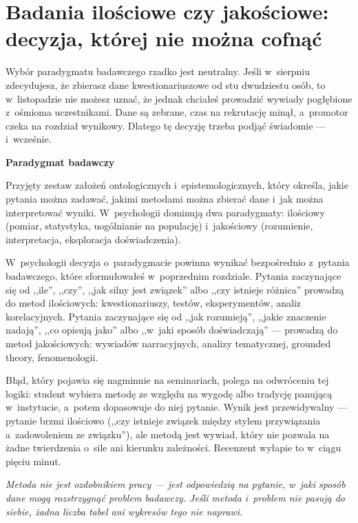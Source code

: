 \documentclass[12pt,a4paper,twoside,openany]{book}
\let\bforigsection\section
\renewcommand{\section}{\needspace{4\baselineskip}\bforigsection}
\newcommand{\pullquote}[1]{%
  \par\vspace{12pt}\noindent
  \begin{tcolorbox}[blanker, breakable, left=2.2em, right=1em, top=2pt, bottom=2pt,
    borderline west={2.5pt}{0pt}{accent}]
    {\color{chaptercolor}\Large\itshape #1}
  \end{tcolorbox}\vspace{10pt}\par
}
\newcommand{\concept}[2]{%
  \par\vspace{6pt}
  \begin{tcolorbox}[enhanced, breakable, colback=accent!6, colframe=accent,
    boxrule=0pt, leftrule=3.5pt, arc=2pt, drop fuzzy shadow={black!15},
    left=10pt, right=10pt, top=7pt, bottom=7pt, before upper={\parindent0pt}]
    {\sffamily\bfseries\color{accent}#1}\par\vspace{2pt}\small #2
  \end{tcolorbox}\par
}
\begin{document}
\section{Badania ilościowe czy jakościowe: decyzja, której nie można cofnąć}

Wybór paradygmatu badawczego rzadko jest neutralny. Jeśli w~sierpniu zdecydujesz, że zbierasz dane kwestionariuszowe od stu dwudziestu osób, to w~listopadzie nie możesz uznać, że jednak chciałeś prowadzić wywiady pogłębione z~ośmioma uczestnikami. Dane są zebrane, czas na rekrutację minął, a~promotor czeka na rozdział wynikowy. Dlatego tę decyzję trzeba podjąć świadomie --- i~wcześnie.

\concept{Paradygmat badawczy}{Przyjęty zestaw założeń ontologicznych i~epistemologicznych, który określa, jakie pytania można zadawać, jakimi metodami można zbierać dane i~jak można interpretować wyniki. W~psychologii dominują dwa paradygmaty: ilościowy (pomiar, statystyka, uogólnianie na populację) i~jakościowy (rozumienie, interpretacja, eksploracja doświadczenia).}

W~psychologii decyzja o~paradygmacie powinna wynikać bezpośrednio z~pytania badawczego, które sformułowałeś w~poprzednim rozdziale. Pytania zaczynające się od ,,ile'', ,,czy'', ,,jak silny jest związek'' albo ,,czy istnieje różnica'' prowadzą do metod ilościowych: kwestionariuszy, testów, eksperymentów, analiz korelacyjnych. Pytania zaczynające się od ,,jak rozumieją'', ,,jakie znaczenie nadają'', ,,co opisują jako'' albo ,,w~jaki sposób doświadczają'' --- prowadzą do metod jakościowych: wywiadów narracyjnych, analizy tematycznej, grounded theory, fenomenologii.

Błąd, który pojawia się nagminnie na seminariach, polega na odwróceniu tej logiki: student wybiera metodę ze względu na wygodę albo tradycję panującą w~instytucie, a~potem dopasowuje do niej pytanie. Wynik jest przewidywalny --- pytanie brzmi ilościowo (,,czy istnieje związek między stylem przywiązania a~zadowoleniem ze związku''), ale metodą jest wywiad, który nie pozwala na żadne twierdzenia o~sile ani kierunku zależności. Recenzent wyłapie to w~ciągu pięciu minut.

\pullquote{Metoda nie jest ozdobnikiem pracy --- jest odpowiedzią na pytanie, w~jaki sposób dane mogą rozstrzygnąć problem badawczy. Jeśli metoda i~problem nie pasują do siebie, żadna liczba tabel ani wykresów tego nie naprawi.}
\end{document}
